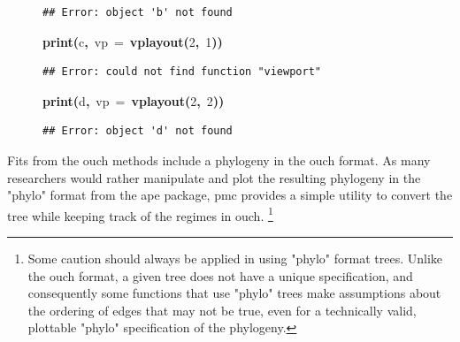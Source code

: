 \documentclass{elsarticle}
\makeatletter
\newcommand{\hlnumber}[1]{\textcolor[rgb]{0,0,0}{#1}}%
\newcommand{\hlfunctioncall}[1]{\textcolor[rgb]{.5,0,.33}{\textbf{#1}}}%
\newcommand{\hlkeyword}[1]{\textbf{#1}}%
\newcommand{\hlargument}[1]{\textcolor[rgb]{.69,.25,.02}{#1}}%
\newcommand{\hlsymbol}[1]{#1}%
\newenvironment{kframe}{%
 \def\FrameCommand##1{\hskip\@totalleftmargin \hskip-\fboxsep
 \colorbox{shadecolor}{##1}\hskip-\fboxsep
     \hskip-\linewidth \hskip-\@totalleftmargin \hskip\columnwidth}%
 \MakeFramed {\advance\hsize-\width
   \@totalleftmargin\z@ \linewidth\hsize
   \@setminipage}}%
 {\par\unskip\endMakeFramed}
\newenvironment{knitrout}{}{} %
\makeatother
\begin{document}
\begin{figure}
\begin{center}
\begin{knitrout}
{\begin{kframe}
\begin{flushleft}
\normalfont
\end{flushleft}
\begin{verbatim}
## Error: object 'b' not found
\end{verbatim}
\begin{flushleft}
\ttfamily\noindent
\hlfunctioncall{print}\hlkeyword{(}\hlsymbol{c}\hlkeyword{,}{\ }\hlargument{vp}{\ }\hlargument{=}{\ }\hlfunctioncall{vplayout}\hlkeyword{(}\hlnumber{2}\hlkeyword{,}{\ }\hlnumber{1}\hlkeyword{)}\hlkeyword{)}\mbox{}
\normalfont
\end{flushleft}
\begin{verbatim}
## Error: could not find function "viewport"
\end{verbatim}
\begin{flushleft}
\ttfamily\noindent
\hlfunctioncall{print}\hlkeyword{(}\hlsymbol{d}\hlkeyword{,}{\ }\hlargument{vp}{\ }\hlargument{=}{\ }\hlfunctioncall{vplayout}\hlkeyword{(}\hlnumber{2}\hlkeyword{,}{\ }\hlnumber{2}\hlkeyword{)}\hlkeyword{)}\mbox{}
\normalfont
\end{flushleft}
\begin{verbatim}
## Error: object 'd' not found
\end{verbatim}
\end{kframe}}
\end{knitrout}

\end{center}
\end{figure}


Fits from the ouch methods include a phylogeny in the ouch format.  As many researchers would rather manipulate and plot the resulting phylogeny in the "phylo" format from the ape package, pmc provides a simple utility to convert the tree while keeping track of the regimes in ouch.  \footnote{Some caution should always be applied in using "phylo" format trees.  Unlike the ouch format, a given tree does not have a unique specification, and consequently some functions that use "phylo" trees make assumptions about the ordering of edges that may not be true, even for a technically valid, plottable "phylo" specification of the phylogeny.}
%
\end{document}
